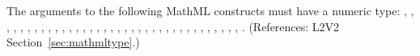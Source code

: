 The arguments to the following MathML constructs must have a numeric type:
, , , , ,
, , , , ,
, , , ,
, , , , ,
, , , , ,
, , , ,
, , , ,
, , , ,
.  (References: L2V2 Section~\ref{sec:mathmltype}.)
